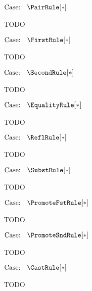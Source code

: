 $\text{Case: }\begin{array}{c} \PairRule[*] \end{array}$
\begin{proofcase}
    TODO
\end{proofcase}

$\text{Case: }\begin{array}{c} \FirstRule[*] \end{array}$
\begin{proofcase}
    TODO
\end{proofcase}

$\text{Case: }\begin{array}{c} \SecondRule[*] \end{array}$
\begin{proofcase}
    TODO
\end{proofcase}

$\text{Case: }\begin{array}{c} \EqualityRule[*] \end{array}$
\begin{proofcase}
    TODO
\end{proofcase}

$\text{Case: }\begin{array}{c} \ReflRule[*] \end{array}$
\begin{proofcase}
    TODO
\end{proofcase}

$\text{Case: }\begin{array}{c} \SubstRule[*] \end{array}$
\begin{proofcase}
    TODO
\end{proofcase}

$\text{Case: }\begin{array}{c} \PromoteFstRule[*] \end{array}$
\begin{proofcase}
    TODO
\end{proofcase}

$\text{Case: }\begin{array}{c} \PromoteSndRule[*] \end{array}$
\begin{proofcase}
    TODO
\end{proofcase}

$\text{Case: }\begin{array}{c} \CastRule[*] \end{array}$
\begin{proofcase}
    TODO
\end{proofcase}

